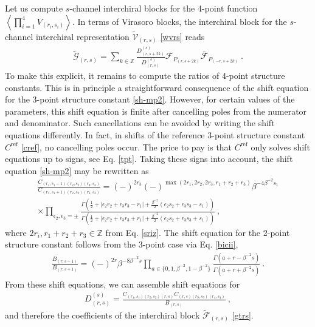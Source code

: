 \documentclass[12pt, a4paper]{article}
\theoremstyle{break}
\begin{document}
Let us compute $s$-channel interchiral blocks for the 4-point function $\left<\prod_{i=1}^4 V_{(r_i,s_i)}\right>$. In terms of Virasoro blocks, the interchiral block for the $s$-channel interchiral representation $\widetilde{\mathcal{V}}_{(r,s)}$ \eqref{wvrs} reads 
\begin{align}
 \widetilde{\mathcal{G}}_{(r,s)} = \sum_{k\in \mathbb{Z}} \frac{D^{(s)}_{(r,s+2k)}}{D^{(s)}_{(r,s)}} \mathcal{F}_{P_{(r,s+2k)}} \bar{\mathcal{F}}_{P_{(-r,s+2k)}}\ . 
 \label{gtrs}
\end{align}
To make this explicit, it remains to compute the ratios of 4-point structure constants. This is in principle a straightforward consequence of the shift equation for the 3-point structure constant \eqref{sh-mp2}. However, for certain values of the parameters, this shift equation 
is finite after cancelling poles from the numerator and denominator. Such cancellations can be avoided by writing the shift equations differently. In fact, in shifts of the reference 3-point structure constant $C^\text{ref}$ \eqref{cref}, no cancelling poles occur. The price to pay is that $C^\text{ref}$ only solves shift equations up to signs, see Eq. \eqref{tpt}. Taking these signs into account, the shift equation \eqref{sh-mp2} may be rewritten as 
\begin{multline}
 \frac{C_{(r_1,s_1-1)(r_2,s_2)(r_3,s_3)}}{C_{(r_1,s_1+1)(r_2,s_2)(r_3,s_3)}} = (-)^{2r_3}(-)^{\max(2r_1,2r_2,2r_3,r_1+r_2+r_3)} \beta^{-4\beta^{-2}s_1} 
 \\ \times 
 \prod_{\epsilon_2,\epsilon_3=\pm} 
 \frac{\Gamma\left(\frac12 + |\epsilon_2r_2+\epsilon_3 r_3-r_1| + \frac{\beta^{-2}}{2}(\epsilon_2s_2+\epsilon_3s_3-s_1)\right)}{\Gamma\left(\frac12 + |\epsilon_2r_2+\epsilon_3 r_3+r_1| + \frac{\beta^{-2}}{2}(\epsilon_2s_2+\epsilon_3s_3+s_1)\right)}\ ,
 \label{cshift}
\end{multline}
where $2r_i, r_1+r_2+r_3\in\mathbb{Z}$ from Eq. \eqref{sriz}. The shift equation for the 2-point structure constant follows from the 3-point case via Eq. \eqref{bicii},
\begin{align}
 \frac{B_{(r,s-1)}}{B_{(r,s+1)}} = (-)^{2r} \beta^{-8\beta^{-2}s} \prod_{a\in \{0,1,\beta^{-2},1-\beta^{-2}\}} \frac{\Gamma(a+r-\beta^{-2}s)}{\Gamma(a+r+\beta^{-2}s)}\ . 
 \label{bshift}
\end{align}
From these shift equations, we can assemble shift equations for 
\begin{align}
 D_{(r,s)}^{(s)} = \frac{C_{(r_1,s_1)(r_2,s_2)(r,s)}C_{(r,s)(r_3,s_3)(r_4,s_4)}}{B_{(r,s)}}\ , 
\end{align}
and therefore the coefficients of the interchiral block $ \widetilde{\mathcal{F}}_{(r,s)}$ \eqref{gtrs}. 
\end{document}
